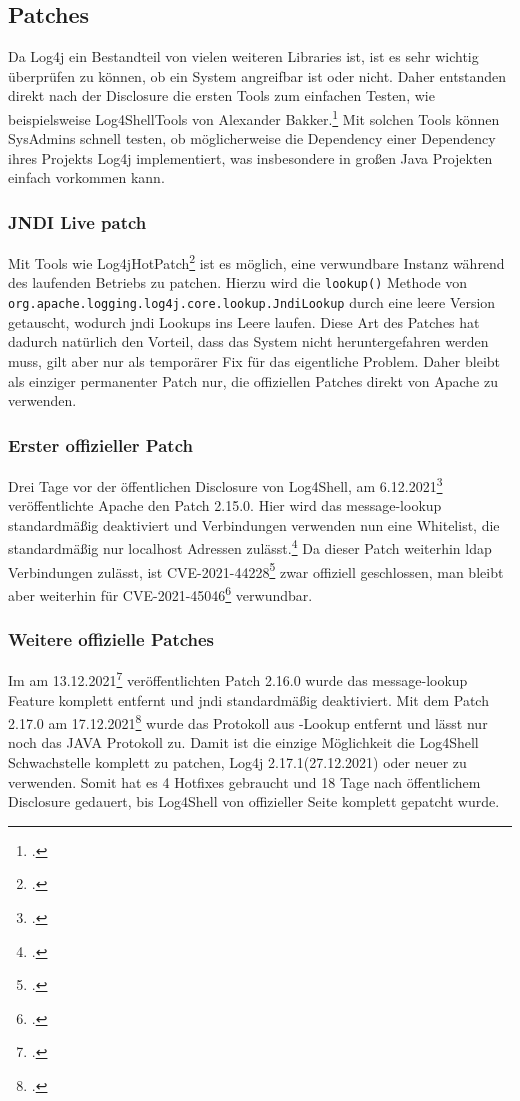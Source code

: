 
\subsection{Patches}\label{subsec:patches}
Da Log4j ein Bestandteil von vielen weiteren Libraries ist, ist es sehr wichtig überprüfen zu können, ob ein System angreifbar ist oder nicht.
Daher entstanden direkt nach der Disclosure die ersten Tools zum einfachen Testen, wie beispielsweise Log4ShellTools von Alexander Bakker.\footcite{log4ShellTools}
Mit solchen Tools können SysAdmins schnell testen, ob möglicherweise die Dependency einer Dependency ihres Projekts Log4j implementiert, was insbesondere in großen Java Projekten einfach vorkommen kann.

\subsubsection{JNDI Live patch}
Mit Tools wie Log4jHotPatch\footcite{hotpatch} ist es möglich, eine verwundbare Instanz während des laufenden Betriebs zu patchen.
Hierzu wird die \verb|lookup()| Methode von \verb|org.apache.logging.log4j.core.lookup.JndiLookup| durch eine leere Version getauscht, wodurch \gls{jndi} Lookups ins Leere laufen.
Diese Art des Patches hat dadurch natürlich den Vorteil, dass das System nicht heruntergefahren werden muss, gilt aber nur als temporärer Fix für das eigentliche Problem.
Daher bleibt als einziger permanenter Patch nur, die offiziellen Patches direkt von Apache zu verwenden.

\subsubsection{Erster offizieller Patch}
Drei Tage vor der öffentlichen Disclosure von Log4Shell, am 6.12.2021\footcite{log4jChange} veröffentlichte Apache den Patch 2.15.0.
Hier wird das message-lookup standardmäßig deaktiviert und  Verbindungen verwenden nun eine Whitelist, die standardmäßig nur localhost Adressen zulässt.\footcite{log4jSecurity}
Da dieser Patch weiterhin \gls{ldap} Verbindungen zulässt, ist CVE-2021-44228\footcite{44228} zwar offiziell geschlossen, man bleibt aber weiterhin für CVE-2021-45046\footcite{45046} verwundbar.

\subsubsection{Weitere offizielle Patches}
Im am 13.12.2021\footcite{log4jChange} veröffentlichten Patch 2.16.0 wurde das message-lookup Feature komplett entfernt und \gls{jndi} standardmäßig deaktiviert.
Mit dem Patch 2.17.0 am 17.12.2021\footcite{log4jChange} wurde das  Protokoll aus -Lookup entfernt und lässt nur noch das JAVA Protokoll zu.
Damit ist die einzige Möglichkeit die Log4Shell Schwachstelle komplett zu patchen, Log4j 2.17.1(27.12.2021) oder neuer zu verwenden.
Somit hat es 4 Hotfixes gebraucht und 18 Tage nach öffentlichem Disclosure gedauert, bis Log4Shell von offizieller Seite komplett gepatcht wurde.
